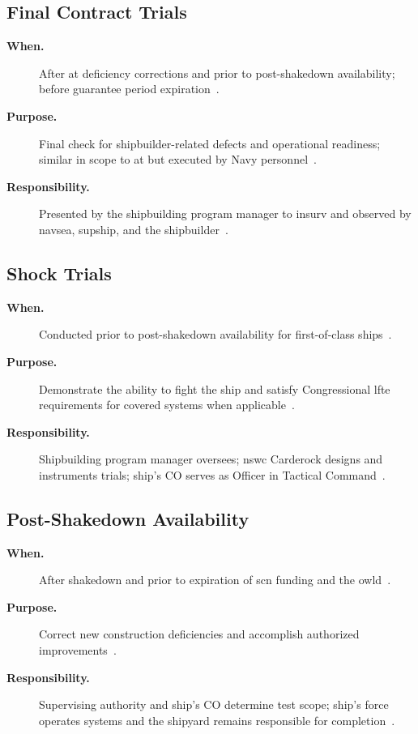 \documentclass[../main.tex]{subfiles}
\begin{document}
\subsection{Final Contract Trials}
\begin{description}
  \item[\textbf{When.}] After \ac{at} deficiency corrections and prior to post-shakedown availability; before guarantee period expiration~\autocite{edo-3-5-7-ship-trials-2025}.
  \item[\textbf{Purpose.}] Final check for shipbuilder-related defects and operational readiness; similar in scope to \ac{at} but executed by Navy personnel~\autocite{edo-3-5-7-ship-trials-2025}.
  \item[\textbf{Responsibility.}] Presented by the shipbuilding program manager to \ac{insurv} and observed by \ac{navsea}, \ac{supship}, and the shipbuilder~\autocite{edo-3-5-7-ship-trials-2025}.
\end{description}

\subsection{Shock Trials}
\begin{description}
  \item[\textbf{When.}] Conducted prior to post-shakedown availability for first-of-class ships~\autocite{edo-3-5-7-ship-trials-2025}.
  \item[\textbf{Purpose.}] Demonstrate the ability to fight the ship and satisfy Congressional \ac{lfte} requirements for covered systems when applicable~\autocite{USC-10-4172,DoDI5000-98,edo-3-5-7-ship-trials-2025}.
  \item[\textbf{Responsibility.}] Shipbuilding program manager oversees; \ac{nswc} Carderock designs and instruments trials; ship's CO serves as Officer in Tactical Command~\autocite{edo-3-5-7-ship-trials-2025}.
\end{description}

\subsection{Post-Shakedown Availability}
\begin{description}
  \item[\textbf{When.}] After shakedown and prior to expiration of \ac{scn} funding and the \ac{owld}~\autocite{edo-3-5-7-ship-trials-2025}.
  \item[\textbf{Purpose.}] Correct new construction deficiencies and accomplish authorized improvements~\autocite{edo-3-5-7-ship-trials-2025}.
  \item[\textbf{Responsibility.}] Supervising authority and ship's CO determine test scope; ship's force operates systems and the shipyard remains responsible for completion~\autocite{edo-3-5-7-ship-trials-2025}.
\end{description}
\end{document}
